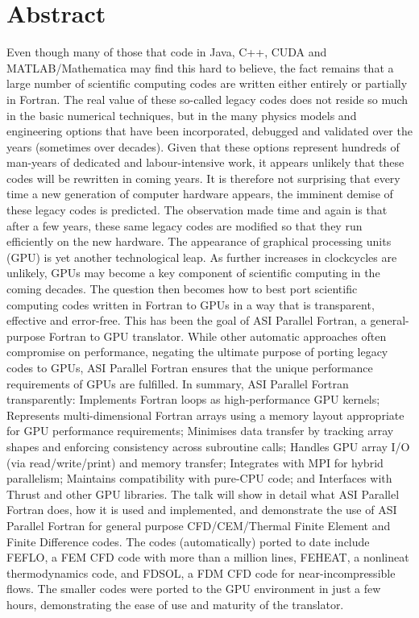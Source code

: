\documentclass[article, A4, 11pt]{llncs}%
\begin{document}
\section*{Abstract}
Even though many of those that code in Java, C++, CUDA and MATLAB/Mathematica may find this hard to believe, the fact remains that a large number of scientific computing codes are written either entirely or partially in Fortran. The real value of these so-called legacy codes does not reside so much in the basic numerical techniques, but in the many physics models and engineering options that have been incorporated, debugged and validated over the years (sometimes over decades). Given that these options represent hundreds of man-years of dedicated and labour-intensive work, it appears unlikely that these codes will be rewritten in coming years. It is therefore not surprising that every time a new generation of computer hardware appears, the imminent demise of these legacy codes is predicted. The observation made time and again is that after a few years, these same legacy codes are modified so that they run efficiently on the new hardware.  The appearance of graphical processing units (GPU) is yet another technological leap. As further increases in clockcycles are unlikely, GPUs may become a key component of scientific computing in the coming decades. The question then becomes how to best port scientific computing codes written in Fortran to GPUs in a way that is transparent, effective and error-free. This has been the goal of ASI Parallel Fortran, a general-purpose Fortran to GPU translator. While other automatic approaches often compromise on performance, negating the ultimate purpose of porting legacy codes to GPUs, ASI Parallel Fortran ensures that the unique performance requirements of GPUs are fulfilled. In summary, ASI Parallel Fortran transparently: Implements Fortran loops as high-performance GPU kernels; Represents multi-dimensional Fortran arrays using a memory layout appropriate for GPU performance requirements;  Minimises data transfer by tracking array shapes and enforcing consistency across subroutine calls; Handles GPU array I/O (via read/write/print) and memory transfer; Integrates with MPI for hybrid parallelism; Maintains compatibility with pure-CPU code; and Interfaces with Thrust and other GPU libraries. The talk will show in detail what ASI Parallel Fortran does, how it is used and implemented, and demonstrate the use of  ASI Parallel Fortran for general purpose CFD/CEM/Thermal Finite Element and Finite Difference codes. The codes (automatically) ported to date include FEFLO, a FEM CFD code with more than a million lines, FEHEAT, a nonlineat thermodynamics code, and FDSOL, a FDM CFD code for near-incompressible flows. The smaller codes were ported to the GPU environment in just a few hours, demonstrating the ease of use and maturity of the translator.
\end{document}
